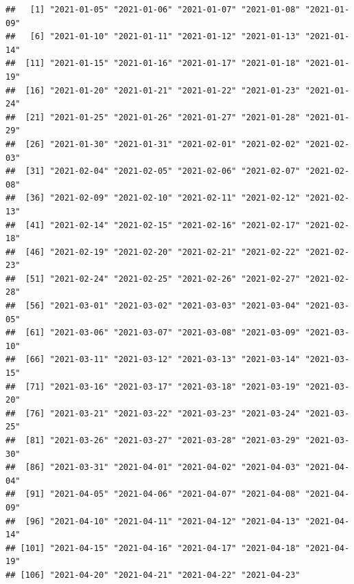 \documentclass[11pt,]{book}
\newenvironment{Shaded}{\begin{snugshade}}{\end{snugshade}}
\newcommand{\DataTypeTok}[1]{\textcolor[rgb]{0.27,0.27,0.27}{#1}}
\newcommand{\KeywordTok}[1]{\textcolor[rgb]{0.27,0.27,0.27}{\textbf{#1}}}
\newcommand{\NormalTok}[1]{#1}
\newcommand{\OperatorTok}[1]{\textcolor[rgb]{0.43,0.43,0.43}{\textbf{#1}}}
\newcommand{\StringTok}[1]{\textcolor[rgb]{0.5,0.5,0.5}{#1}}
\begin{document}
\begin{verbatim}
##   [1] "2021-01-05" "2021-01-06" "2021-01-07" "2021-01-08" "2021-01-09"
##   [6] "2021-01-10" "2021-01-11" "2021-01-12" "2021-01-13" "2021-01-14"
##  [11] "2021-01-15" "2021-01-16" "2021-01-17" "2021-01-18" "2021-01-19"
##  [16] "2021-01-20" "2021-01-21" "2021-01-22" "2021-01-23" "2021-01-24"
##  [21] "2021-01-25" "2021-01-26" "2021-01-27" "2021-01-28" "2021-01-29"
##  [26] "2021-01-30" "2021-01-31" "2021-02-01" "2021-02-02" "2021-02-03"
##  [31] "2021-02-04" "2021-02-05" "2021-02-06" "2021-02-07" "2021-02-08"
##  [36] "2021-02-09" "2021-02-10" "2021-02-11" "2021-02-12" "2021-02-13"
##  [41] "2021-02-14" "2021-02-15" "2021-02-16" "2021-02-17" "2021-02-18"
##  [46] "2021-02-19" "2021-02-20" "2021-02-21" "2021-02-22" "2021-02-23"
##  [51] "2021-02-24" "2021-02-25" "2021-02-26" "2021-02-27" "2021-02-28"
##  [56] "2021-03-01" "2021-03-02" "2021-03-03" "2021-03-04" "2021-03-05"
##  [61] "2021-03-06" "2021-03-07" "2021-03-08" "2021-03-09" "2021-03-10"
##  [66] "2021-03-11" "2021-03-12" "2021-03-13" "2021-03-14" "2021-03-15"
##  [71] "2021-03-16" "2021-03-17" "2021-03-18" "2021-03-19" "2021-03-20"
##  [76] "2021-03-21" "2021-03-22" "2021-03-23" "2021-03-24" "2021-03-25"
##  [81] "2021-03-26" "2021-03-27" "2021-03-28" "2021-03-29" "2021-03-30"
##  [86] "2021-03-31" "2021-04-01" "2021-04-02" "2021-04-03" "2021-04-04"
##  [91] "2021-04-05" "2021-04-06" "2021-04-07" "2021-04-08" "2021-04-09"
##  [96] "2021-04-10" "2021-04-11" "2021-04-12" "2021-04-13" "2021-04-14"
## [101] "2021-04-15" "2021-04-16" "2021-04-17" "2021-04-18" "2021-04-19"
## [106] "2021-04-20" "2021-04-21" "2021-04-22" "2021-04-23"
\end{verbatim}

\begin{Shaded}
\end{Shaded}
\end{document}
